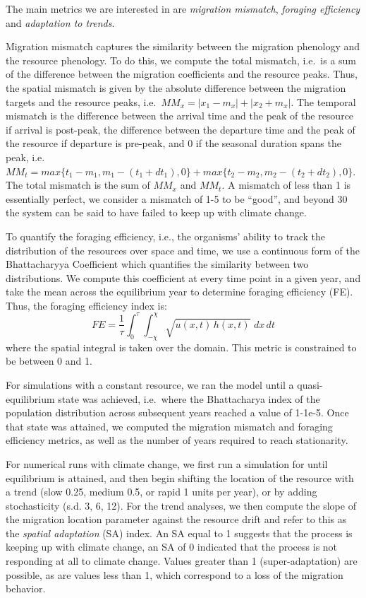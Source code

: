 \documentclass[12pt]{article}
\begin{document}
The main metrics we are interested in are \emph{migration mismatch}, \emph{foraging efficiency} and \emph{adaptation to trends}.

Migration mismatch captures the similarity between the migration phenology and the resource phenology. To do this, we compute the total mismatch, i.e.~is a sum of the difference between the migration coefficients and the resource peaks. Thus, the spatial mismatch is given by the absolute difference between the migration targets and the resource peaks, i.e.~$MM_x = |x_1 - m_x| + |x_2 + m_x|$. The temporal mismatch is the difference between the arrival time and the peak of the resource if arrival is post-peak, the difference between the departure time and the peak of the resource if departure is pre-peak, and 0 if the seasonal duration spans the peak, i.e.~$MM_t = max\{t_1 - m_1, m_1 - (t_1 + dt_1), 0\} + max\{t_2 - m_2, m_2 - (t_2 + dt_2), 0\}$. The total mismatch is the sum of $MM_x$ and $MM_t$. A mismatch of less than 1 is essentially perfect, we consider a mismatch of 1-5 to be ``good'', and beyond 30 the system can be said to have failed to keep up with climate change.

To quantify the foraging efficiency, i.e., the organisms' ability to track the distribution of the resources over space and time, we use a continuous form of the Bhattacharyya Coefficient \citep{Bhattacharyya1943} which quantifies the similarity between two distributions. We compute this coefficient at every time point in a given year, and take the mean across the equilibrium year to determine foraging efficiency (FE). Thus, the foraging efficiency index is:
$$FE = \frac{1}{\tau} \int_{0}^\tau \int_{-\chi}^{\chi} \sqrt{u(x,t) \, h(x,t)} \,\, dx\,dt$$
\noindent where the spatial integral is taken over the domain. This metric is constrained to be between 0 and 1.

For simulations with a constant resource, we ran the model until a quasi-equilibrium state was achieved, i.e.~where the Bhattacharya index of the population distribution across subsequent years reached a value of 1-1e-5. Once that state was attained, we computed the migration mismatch and foraging efficiency metrics, as well as the number of years required to reach stationarity.

For numerical runs with climate change, we first run a simulation for until equilibrium is attained, and then begin shifting the location of the resource with a trend (slow 0.25, medium 0.5, or rapid 1 units per year), or by adding stochasticity (s.d. 3, 6, 12). For the trend analyses, we then compute the slope of the migration location parameter against the resource drift and refer to this as the \emph{spatial adaptation} (SA) index. An SA equal to 1 suggests that the process is keeping up with climate change, an SA of 0 indicated that the process is not responding at all to climate change.  Values greater than 1 (super-adaptation) are possible, as are values less than 1, which correspond to a loss of the migration behavior.
\end{document}
